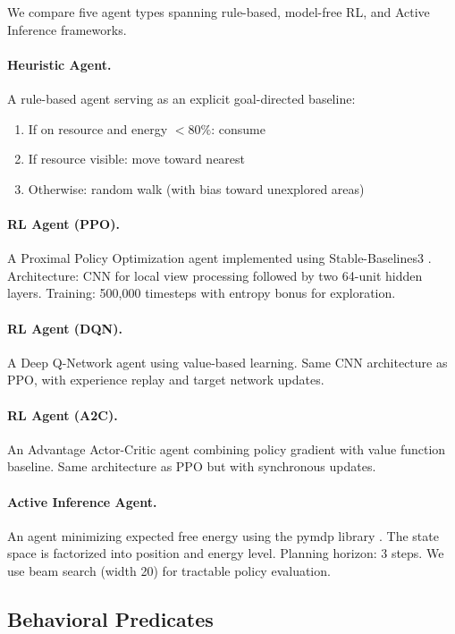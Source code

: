 \documentclass{article}
\begin{document}
We compare five agent types spanning rule-based, model-free RL, and Active Inference frameworks.

\paragraph{Heuristic Agent.} A rule-based agent serving as an explicit goal-directed baseline:
\begin{enumerate}
    \item If on resource and energy $< 80\%$: consume
    \item If resource visible: move toward nearest
    \item Otherwise: random walk (with bias toward unexplored areas)
\end{enumerate}

\paragraph{RL Agent (PPO).} A Proximal Policy Optimization agent \cite{schulman2017proximal} implemented using Stable-Baselines3 \cite{raffin2021stable}. Architecture: CNN for local view processing followed by two 64-unit hidden layers. Training: 500,000 timesteps with entropy bonus for exploration.

\paragraph{RL Agent (DQN).} A Deep Q-Network agent using value-based learning. Same CNN architecture as PPO, with experience replay and target network updates.

\paragraph{RL Agent (A2C).} An Advantage Actor-Critic agent combining policy gradient with value function baseline. Same architecture as PPO but with synchronous updates.

\paragraph{Active Inference Agent.} An agent minimizing expected free energy using the pymdp library \cite{heins2022pymdp}. The state space is factorized into position and energy level. Planning horizon: 3 steps. We use beam search (width 20) for tractable policy evaluation.

\subsection{Behavioral Predicates}
\end{document}
